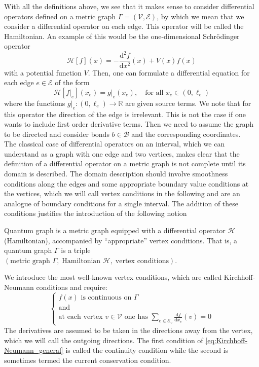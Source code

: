 With all the definitions above, we see that it makes sense to consider differential operators defined on a metric graph $\Gamma = (\mathcal{V}, \mathcal{E})$, by which we mean that we consider a differential operator on each edge. This operator will be called the Hamiltonian. An example of this would be the one-dimensional Schrödinger operator
\begin{equation*}
    \mathcal{H} \left[ f \right](x) = -\frac{\mathrm{d}^2 f}{\mathrm{d} x^2}(x) + V(x)f(x)
\end{equation*}
with a potential function $V$. Then, one can formulate a differential equation for each edge $e \in \mathcal{E}$ of the form
\begin{equation*}
    \mathcal{H} \left[ f |_e \right] (x_e) = g|_e(x_e), \quad \text{for all  } x_e \in (0, \ell_e)
\end{equation*}
where the functions $g|_e \colon (0, \ell_e) \to \mathbb{R}$ are given source terms. We note that for this operator the direction of the edge is irrelevant. This is not the case if one wants to include first order derivative terms. Then we need to assume the graph to be directed and consider bonds $b \in \mathcal{B}$ and the corresponding coordinates. \\
The classical case of differential operators on an interval, which we can understand as a graph with one edge and two vertices, makes clear that the definition of a differential operator on a metric graph is not complete until its domain is described. The domain description should involve smoothness conditions along the edges and some appropriate boundary value conditions at the vertices, which we will call vertex conditions in the following and are an analogue of boundary conditions for a single interval. The addition of these conditions justifies the introduction of the following notion
\begin{definition}
    \label{quantum graph}
    Quantum graph is a metric graph equipped with a differential operator $\mathcal{H}$ (Hamiltonian), accompanied by “appropriate” vertex conditions. That is, a quantum graph $\Gamma$ is a triple $(\text{metric graph } \Gamma, \; \text{Hamiltonian } \mathcal{H}, \; \text{vertex conditions})$.
\end{definition}
We introduce the most well-known vertex conditions, which are called Kirchhoff-Neumann conditions and require: 
\begin{equation}
    \label{eq:Kirchhoff-Neumann_general}
    \begin{cases} 
        f(x) \text{ is continuous on } \Gamma \\ \text{and} \\  \text{at each vertex } v \in \mathcal{V} \text{ one has } \sum_{e \in \mathcal{E}_v} \frac{\mathrm{d} f}{\mathrm{d} x_e}(v) = 0
    \end{cases}
\end{equation}
The derivatives are assumed to be taken in the directions away from the vertex, which we will call the outgoing directions. The first condition of \cref{eq:Kirchhoff-Neumann_general} is called the continuity condition while the second is sometimes termed the current conservation condition.

